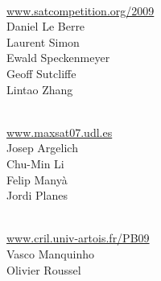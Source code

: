\documentclass[10pt]{article}
\newcommand{\bthlight}[1]{{\color[rgb]{0.2,0.2,0.5}#1}}
\begin{document}
\begin{minipage}[t]{9.25cm}
  \begin{minipage}[t]{9.25cm}
    \vspace*{0.35cm}
    \begin{minipage}[t]{4.5cm}
      \bthlight{{\bf SAT Competition}} \\
               {\small \url{www.satcompetition.org/2009}}\\[0.15cm]
               Daniel Le Berre\\
               Laurent Simon\\[0.15cm]
               Ewald Speckenmeyer\\
               Geoff Sutcliffe \\
               Lintao Zhang %
    \end{minipage}
    \hspace*{0.5cm}
    \begin{minipage}[t]{4.25cm}
      \bthlight{{\bf MAX-SAT Evaluation}}\\
               {\small \url{www.maxsat07.udl.es}}\\[0.15cm]
               Josep Argelich\\
               Chu-Min Li\\
               Felip Many\`{a}\\
               Jordi Planes %
    \end{minipage}

    \begin{minipage}[t]{9.25cm}
      \vspace*{0.25cm}
      \begin{minipage}[t]{4.5cm}
        \bthlight{{\bf PB Evaluation}}\\
                 {\small \url{www.cril.univ-artois.fr/PB09}}\\[0.15cm]
                 Vasco Manquinho\\
                 Olivier Roussel %
      \end{minipage}
    \end{minipage}
  \end{minipage}


\end{minipage}
%
\end{document}

